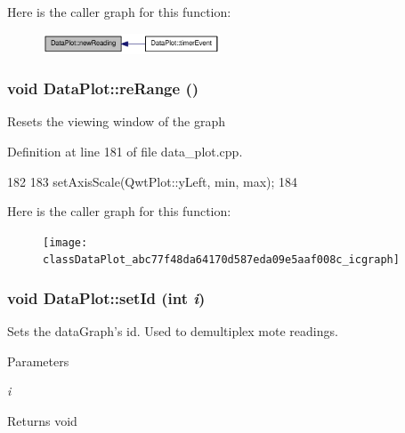 Here is the caller graph for this function:\nopagebreak
\begin{figure}[H]
\begin{center}
\leavevmode
\includegraphics[width=149pt]{classDataPlot_a36fe7e25f67a168d4f7dd2eaa2627003_icgraph}
\end{center}
\end{figure}


\hypertarget{classDataPlot_abc77f48da64170d587eda09e5aaf008c}{
\subsubsection[{reRange}]{\setlength{\rightskip}{0pt plus 5cm}void DataPlot::reRange ()}}
\label{classDataPlot_abc77f48da64170d587eda09e5aaf008c}
Resets the viewing window of the graph 

Definition at line 181 of file data\_\-plot.cpp.




\begin{DoxyCode}
182 {
183     setAxisScale(QwtPlot::yLeft, min, max);
184 }
\end{DoxyCode}




Here is the caller graph for this function:\nopagebreak
\begin{figure}[H]
\begin{center}
\leavevmode
\texttt{[image: classDataPlot\_abc77f48da64170d587eda09e5aaf008c\_icgraph]}
\end{center}
\end{figure}


\hypertarget{classDataPlot_ab6af06dfac3585a7dc669ea333a0869d}{
\subsubsection[{setId}]{\setlength{\rightskip}{0pt plus 5cm}void DataPlot::setId (int {\em i})}}
\label{classDataPlot_ab6af06dfac3585a7dc669ea333a0869d}
Sets the dataGraph's id. Used to demultiplex mote readings. 
\begin{DoxyParams}{Parameters}
\item[{\em i}]\end{DoxyParams}
\begin{DoxyReturn}{Returns}
void 
\end{DoxyReturn}


